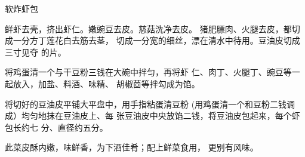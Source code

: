 \begin{recipe}{软炸虾包}

\ingredients




\cooking

\step 鲜虾去壳，挤出虾仁。嫩豌豆去皮。慈菇洗净去皮。 猪肥膘肉、火腿去皮，都切成一分方丁莲花白去筋去茎， 切成一分宽的细丝，漂在清水中待用。豆油皮切成三寸见夺 的片。

\step 将鸡蛋清一个与干豆粉三钱在大碗中拌匀，再将虾 仁、肉丁、火腿丁、豌豆等一起放入，加盐、料酒、味精、 胡椒茴等拌勾成为馅。

将切好的豆油皮平铺大平盘中，用手指粘蛋清豆粉 (用鸡蛋清一个和豆粉二钱调成）均匀地抹在豆油皮上、每 张豆油皮中央放馅二钱，将豆油皮包起来，每个虾包长约七 分、直径约五分。

\notes

此菜皮酥内嫩，味鲜香，为下酒佳肴；配上鲜菜食用， 更别有风味。

\end{recipe}

